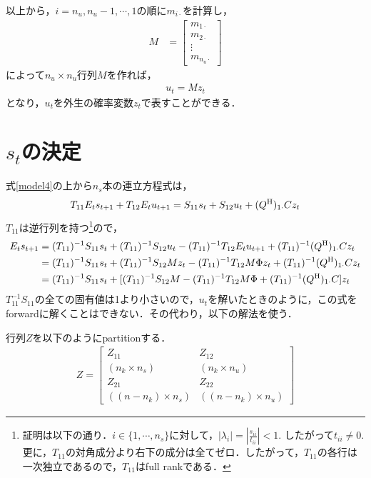 \documentclass[a4j, dvipdfmx]{jarticle}
\begin{document}
以上から，$i = n_u, n_u-1, \cdots, 1$の順に$m_{i\cdot}$を計算し，
\begin{align}
M &= \begin{bmatrix}m_{1\cdot} \\ m_{2\cdot} \\ \vdots \\ m_{n_u\cdot}\end{bmatrix}
\end{align}
によって$n_u \times n_u$行列$M$を作れば，
\begin{align}
u_t = Mz_t \label{solutionu}
\end{align}
となり，$u_t$を外生の確率変数$z_t$で表すことができる．

\section{$s_t$の決定}

式\eqref{model4}の上から$n_s$本の連立方程式は，
\begin{align*}
T_{11}E_ts_{t+1} + T_{12}E_tu_{t+1} = S_{11}s_t + S_{12}u_t + (Q^{\rm{H}})_{1\cdot}Cz_t
\end{align*}
$T_{11}$は逆行列を持つ\footnote{証明は以下の通り．$i \in \{1, \cdots, n_s\}$に対して，$|\lambda_i| = |\frac{s_{ii}}{t_{ii}}|<1$. したがって$t_{ii}\not=0$. 更に，$T_{11}$の対角成分より右下の成分は全てゼロ．したがって，$T_{11}$の各行は一次独立であるので，$T_{11}$はfull rankである．}ので，
\begin{align}
E_ts_{t+1} &= (T_{11})^{-1}S_{11}s_t + (T_{11})^{-1}S_{12}u_t - (T_{11})^{-1}T_{12}E_tu_{t+1} + (T_{11})^{-1}(Q^{\rm{H}})_{1\cdot}Cz_t\notag\\
&= (T_{11})^{-1}S_{11}s_t + (T_{11})^{-1}S_{12}Mz_t - (T_{11})^{-1}T_{12}M\Phi z_t + (T_{11})^{-1}(Q^{\rm{H}})_{1\cdot}Cz_t\notag\\
&= (T_{11})^{-1}S_{11}s_t + [(T_{11})^{-1}S_{12}M - (T_{11})^{-1}T_{12}M\Phi + (T_{11})^{-1}(Q^{\rm{H}})_{1\cdot}C]z_t\label{models1}
\end{align}
$T_{11}^{-1}S_{11}$の全ての固有値は1より小さいので，$u_t$を解いたときのように，この式をforwardに解くことはできない．その代わり，以下の解法を使う．

行列$Z$を以下のようにpartitionする．
\begin{align*}
Z = \begin{bmatrix}Z_{11} & Z_{12} \\ {\scriptscriptstyle (n_k\times n_s)} & {\scriptscriptstyle (n_k\times n_u)} \\ Z_{21} & Z_{22} \\ {\scriptscriptstyle ((n-n_k)\times n_s)} & {\scriptscriptstyle ((n-n_k)\times n_u)} \end{bmatrix} \end{align*}
\end{document}
